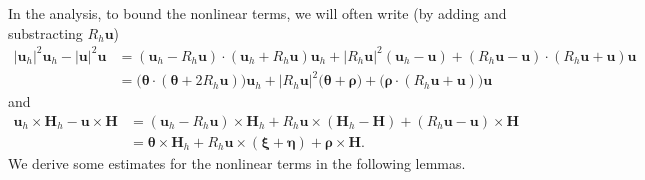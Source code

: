 \documentclass[11pt, reqno]{amsart}
\theoremstyle{definition}
\theoremstyle{remark}
\numberwithin{equation}{section}
\newcommand{\bff}{\boldsymbol}
\newcommand{\abs}[1]{\left|{#1}\right|}
\begin{document}
In the analysis, to bound the nonlinear terms, we will often write (by adding and substracting $R_h \bff{u}$)
\begin{align}\label{equ:nonlinear Rh u}
	\nonumber
	|\bff{u}_h|^2 \bff{u}_h - |\bff{u}|^2 \bff{u}
	&=
	(\bff{u}_h- R_h \bff{u}) \cdot (\bff{u}_h+ R_h \bff{u}) \bff{u}_h
	+
	|R_h \bff{u}|^2 (\bff{u}_h-\bff{u})
	+
	(R_h \bff{u} - \bff{u})\cdot (R_h \bff{u}+ \bff{u}) \bff{u}
	\\
	&=
	\big(\bff{\theta} \cdot (\bff{\theta}+ 2 R_h \bff{u}) \big) \bff{u}_h
	+
	\abs{R_h \bff{u}}^2 \big(\bff{\theta}+\bff{\rho}\big)
	+
	\big( \bff{\rho} \cdot (R_h \bff{u} + \bff{u}) \big) \bff{u}
\end{align}
and
\begin{align}\label{equ:nonlinear cross}
	\bff{u}_h \times \bff{H}_h - \bff{u} \times \bff{H}
	\nonumber
	&=
	(\bff{u}_h - R_h \bff{u})\times \bff{H}_h
	+
	R_h \bff{u} \times (\bff{H}_h-\bff{H})
	+
	(R_h \bff{u}-\bff{u}) \times \bff{H}
	\\
	&= 
	\bff{\theta} \times \bff{H}_h
	+
	R_h\bff{u} \times (\bff{\xi}+\bff{\eta})
	+
	\bff{\rho} \times \bff{H}.
\end{align}
We derive some estimates for the nonlinear terms in the following lemmas.
\end{document}
